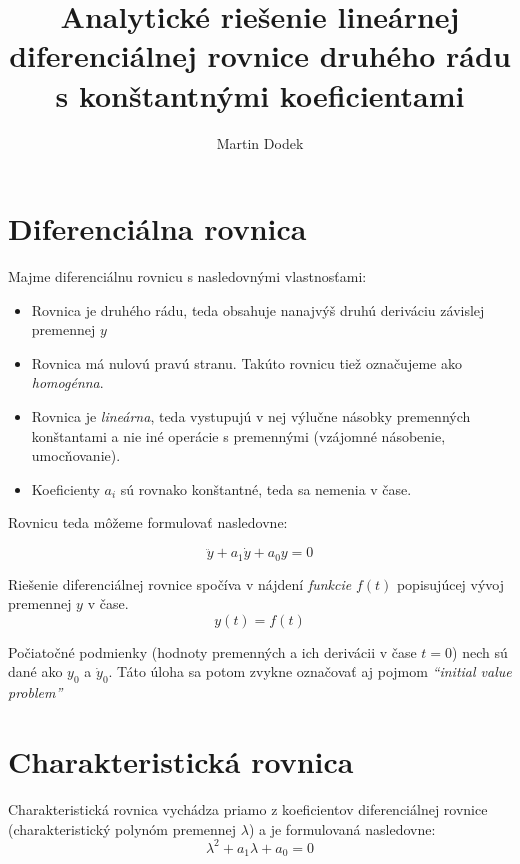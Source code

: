 \documentclass[a4paper,10pt]{article}
\begin{document}
\title{Analytické riešenie lineárnej diferenciálnej rovnice druhého rádu s konštantnými koeficientami}
\author{Martin Dodek}
\pagestyle{plain}
\maketitle

\section{Diferenciálna rovnica}
Majme diferenciálnu rovnicu s nasledovnými vlastnosťami:
\begin{itemize}
 \item Rovnica je druhého rádu, teda obsahuje nanajvýš druhú deriváciu závislej premennej $y$
 \item Rovnica má nulovú pravú stranu. Takúto rovnicu tiež označujeme ako \emph{homogénna}.
 \item Rovnica je \emph{lineárna}, teda vystupujú v nej výlučne násobky premenných konštantami a nie iné operácie s premennými (vzájomné násobenie, umocňovanie).
 \item Koeficienty $a_i$ sú rovnako konštantné, teda sa nemenia v čase.
\end{itemize}

Rovnicu teda môžeme formulovať nasledovne:

\begin{equation}
\label{eq:diff_eq}
\ddot{y}+a_1\dot{y}+a_0y=0
\end{equation}

Riešenie diferenciálnej rovnice spočíva v nájdení \emph{funkcie} $f(t)$ popisujúcej vývoj premennej $y$ v čase.
\begin{equation*}
	y(t)=f(t)
\end{equation*}

Počiatočné podmienky (hodnoty premenných a ich derivácii v čase $t=0$) nech sú dané ako $y_0$ a $\dot{y}_0$.
Táto úloha sa potom zvykne označovať aj pojmom \emph{``initial value problem''} 

\pagebreak

\section{Charakteristická rovnica}

Charakteristická rovnica vychádza priamo z koeficientov diferenciálnej rovnice (charakteristický polynóm premennej $\lambda$) a je formulovaná nasledovne:
\begin{equation}
\label{eq:charakteristická rovnica}
	\lambda^2+a_1\lambda+a_0=0
\end{equation}
\end{document}

